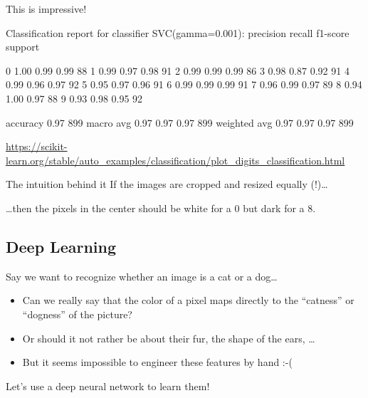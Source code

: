 \begin{frame}[fragile]{This is impressive!}
\begin{lstlistingoutputtiny}
Classification report for classifier SVC(gamma=0.001):
              precision    recall  f1-score   support

           0       1.00      0.99      0.99        88
           1       0.99      0.97      0.98        91
           2       0.99      0.99      0.99        86
           3       0.98      0.87      0.92        91
           4       0.99      0.96      0.97        92
           5       0.95      0.97      0.96        91
           6       0.99      0.99      0.99        91
           7       0.96      0.99      0.97        89
           8       0.94      1.00      0.97        88
           9       0.93      0.98      0.95        92

    accuracy                           0.97       899
   macro avg       0.97      0.97      0.97       899
weighted avg       0.97      0.97      0.97       899
\end{lstlistingoutputtiny}
\tiny{\url{https://scikit-learn.org/stable/auto\_examples/classification/plot\_digits\_classification.html}}

\end{frame}




\begin{frame}{The intuition behind it}
  If the images are cropped and resized equally (!)\ldots

  \vspace{1cm}
  
  \ldots then the pixels in the center should be white for a 0 but dark for a 8.
\end{frame}






\subsection{Deep Learning}


\begin{frame}{Say we want to recognize whether an image is a cat or a dog\ldots}
  \begin{itemize}
  \item Can we really say that the color of a pixel maps directly to the ``catness'' or ``dogness'' of the picture?
  \item Or should it not rather be about their fur, the shape of the ears, \ldots
  \item But it seems impossible to engineer these features by hand :-(
  \end{itemize}

  \pause

  Let's use a deep neural network to learn them!
\end{frame}


